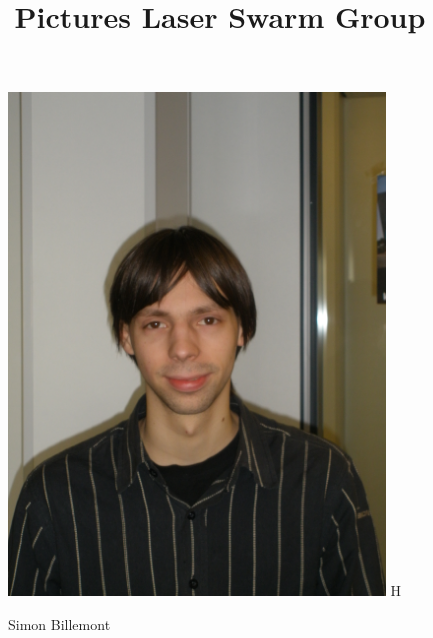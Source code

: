 \documentclass[10pt,a4paper]{article}
\title{Pictures Laser Swarm Group}
\begin{document}
\begin{figure}[H]
\begin{center}
\includegraphics[width=10cm]{pictures/Simon.jpg} H
\end{center}
\caption{Simon Billemont}
\label{wfdbase}
\end{figure}
\end{document}
